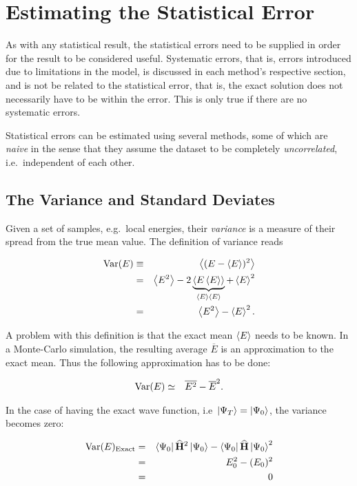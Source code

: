 \section{Estimating the Statistical Error}

As with any statistical result, the statistical errors need to be supplied in order for the result to be considered useful. Systematic errors, that is, errors introduced due to limitations in the model, is discussed in each method's respective section, and is not be related to the statistical error, that is, the exact solution does not necessarily have to be within the error. This is only true if there are no systematic errors.

Statistical errors can be estimated using several methods, some of which are \textit{naive} in the sense that they assume the dataset to be completely \textit{uncorrelated}, i.e.~independent of each other.

\subsection{The Variance and Standard Deviates}
\label{sec:varAndSTD}

Given a set of samples, e.g.~local energies, their \textit{variance} is a measure of their spread from the true mean value. The definition of variance reads

\begin{eqnarray}
\label{eq:variance}
\mathrm{Var}(E) &\equiv& \left< (E-\left< E \right>)^2 \right> \nonumber\\
        &=& \left< E^2 \right> - 2\underbrace{\left< E\left< E \right> \right>}_{\left< E \right>\left< E \right>} + \left< E \right>^2 \nonumber\\
        &=& \left< E^2 \right> - \left< E \right>^2. \\
\end{eqnarray}

A problem with this definition is that the exact mean $\left< E \right>$ needs to be known. In a Monte-Carlo simulation, the resulting average $\overline{E}$ is an approximation to the exact mean. Thus the following approximation has to be done:

\begin{eqnarray}
  \mathrm{Var}(E) &\simeq& \overline{E^2} - \overline{E}^2.
\end{eqnarray}

In the case of having the exact wave function, i.e~$\left| \Psi_T \right> = \left| \Psi_0 \right>$, the variance becomes zero:

\begin{eqnarray*}
\label{eq:varianceZeroExact}
\mathrm{Var}(E)_\mathrm{Exact} &=& \left< \Psi_0 \right|{\bf\widehat{H}}^2\left| \Psi_0 \right> -  \left< \Psi_0 \right|{\bf\widehat{H}}\left| \Psi_0 \right>^2 \\
		        &=& E_0^2 - (E_0)^2 \\
		        &=& 0
\end{eqnarray*}

